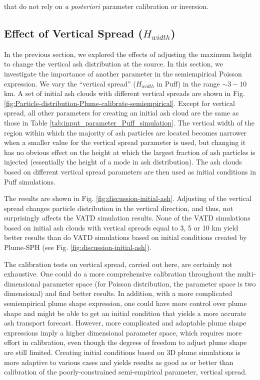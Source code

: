 \documentclass[utf8]{frontiersSCNS} %
\begin{document}
that do not rely on \textit{a posteriori} parameter calibration or inversion.

\subsection{Effect of Vertical Spread ($H_{width}$)}
In the previous section, we explored the effects of adjusting the maximum height to change the vertical ash distribution at the source. In this section, we investigate the importance of another parameter in the semiempirical Poisson expression. We vary the ``vertical spread'' ($H_{width}$ in Puff) in the range $\sim 3 - 10$ km. A set of initial ash clouds  with different vertical spreads are shown in Fig. \ref{fig:Particle-distribution-Plume-calibrate-semiempirical}. Except for vertical spread, all other parameters for creating an initial ash cloud are the same as those in Table \ref{tab:input_parameter_Puff_simulation}. The vertical width of the region within which the majority of ash particles are located becomes narrower when a smaller value for the vertical spread parameter is used, but changing it has no obvious effect on the height at which the largest fraction of ash particles is injected (essentially the height of a mode in ash distribution). The ash clouds based on different vertical spread parameters are then used as initial conditions in Puff simulations.

The results are shown in Fig. \ref{fig:discussion-initial-ash}.  Adjusting of the vertical spread changes particle distribution in the vertical direction, and thus, not surprisingly affects the VATD simulation results. None of the VATD simulations based on initial ash clouds with vertical spreads equal to 3, 5 or 10 km yield better results than do VATD simulations based on initial conditions created by Plume-SPH (see Fig. \ref{fig:discussion-initial-ash}).

The calibration tests on vertical spread, carried out here, are certainly not exhaustive. One could do a more comprehensive calibration throughout the multi-dimensional parameter space (for Poisson distribution, the parameter space is two dimensional) and find better results. In addition, with a more complicated semiempirical plume shape expression, one could have more control over plume shape and might be able to get an initial condition that yields a more accurate ash transport forecast. However, more complicated and adaptable plume shape expressions imply a higher dimensional parameter space, which requires more effort in calibration, even though the degrees of freedom to adjust plume shape are still limited.  Creating initial conditions based on 3D plume simulations is more adaptive to various cases and yields results as good as or better than calibration of the poorly-constrained semi-empirical parameter, vertical spread.
\end{document}
